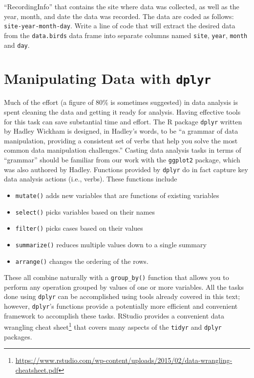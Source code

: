 \documentclass[]{krantz}
\providecommand{\tightlist}{%
  \setlength{\itemsep}{0pt}\setlength{\parskip}{0pt}}
\renewcommand{\href}[2]{#2\footnote{\url{#1}}}
\begin{document}
``RecordingInfo'' that contains the site where data was collected, as
well as the year, month, and date the data was recorded. The data are
coded as follows: \texttt{site-year-month-day}. Write a line of code
that will extract the desired data from the \texttt{data.birds} data
frame into separate columns named \texttt{site}, \texttt{year},
\texttt{month} and \texttt{day}.

\section{\texorpdfstring{Manipulating Data with
\texttt{dplyr}}{Manipulating Data with dplyr}}\label{dplyr}

Much of the effort (a figure of 80\% is sometimes suggested) in data
analysis is spent cleaning the data and getting it ready for analysis.
Having effective tools for this task can save substantial time and
effort. The R package \texttt{dplyr} written by Hadley Wickham is
designed, in Hadley's words, to be ``a grammar of data manipulation,
providing a consistent set of verbs that help you solve the most common
data manipulation challenges.'' Casting data analysis tasks in terms of
``grammar'' should be familiar from our work with the \texttt{ggplot2}
package, which was also authored by Hadley. Functions provided by
\texttt{dplyr} do in fact capture key data analysis actions (i.e.,
verbs). These functions include

\begin{itemize}
\tightlist
\item
  \texttt{mutate()} adds new variables that are functions of existing
  variables
\item
  \texttt{select()} picks variables based on their names
\item
  \texttt{filter()} picks cases based on their values
\item
  \texttt{summarize()} reduces multiple values down to a single summary
\item
  \texttt{arrange()} changes the ordering of the rows.
\end{itemize}

These all combine naturally with a \texttt{group\_by()} function that
allows you to perform any operation grouped by values of one or more
variables. All the tasks done using \texttt{dplyr} can be accomplished
using tools already covered in this text; however, \texttt{dplyr}'s
functions provide a potentially more efficient and convenient framework
to accomplish these tasks. RStudio provides a convenient
\href{https://www.rstudio.com/wp-content/uploads/2015/02/data-wrangling-cheatsheet.pdf}{data
wrangling cheat sheet} that covers many aspects of the \texttt{tidyr}
and \texttt{dplyr} packages.
\end{document}
